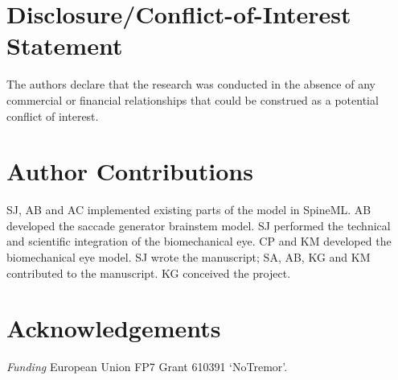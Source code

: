 \documentclass{frontiersSCNS}
\begin{document}

\section*{Disclosure/Conflict-of-Interest Statement}

The authors declare that the research was conducted in the absence of
any commercial or financial relationships that could be construed as a
potential conflict of interest.

\section*{Author Contributions}

SJ, AB and AC implemented existing parts of the model in SpineML. AB
developed the saccade generator brainstem model. SJ performed the
technical and scientific integration of the biomechanical eye.  CP and
KM developed the biomechanical eye model. SJ wrote the manuscript; SA,
AB, KG and KM contributed to the manuscript. KG conceived the
project.

\section*{Acknowledgements}

\textit{Funding\textcolon} European Union FP7 Grant 610391 `NoTremor'.
\end{document}
